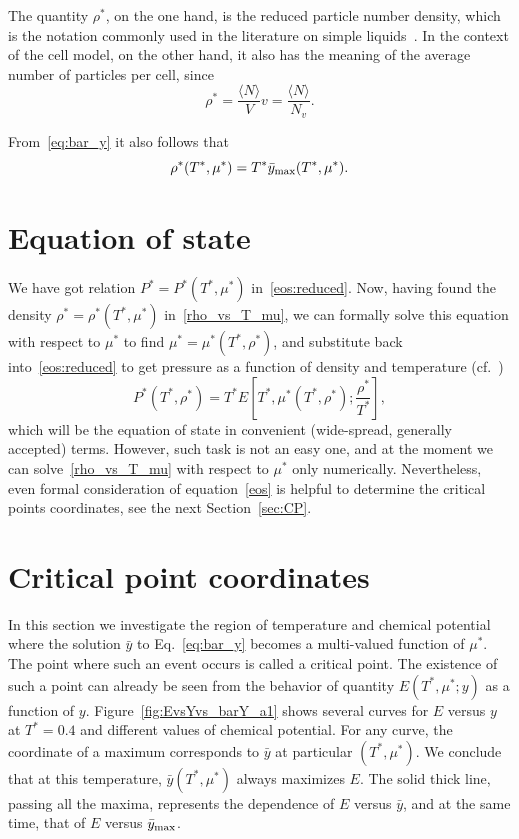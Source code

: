 \documentclass[12pt]{article}
\numberwithin{equation}{section}
\begin{document}
	The quantity $\rho^*$, on the one hand, is the reduced particle number density, which is the notation commonly used in the literature on simple liquids~\cite{HansenMcDonald13}. In the context of the cell model, on the other hand, it also has the meaning of the average number of particles per cell, since
	\begin{equation}
		\rho^* = \frac{\langle N \rangle}{V} v = \frac{\langle N \rangle}{N_v}.
	\end{equation}
	
	From~\eqref{eq:bar_y} it also follows that
	\begin{equation}
		\label{rho_vs_T_mu}
		\rho^*(T^*,\mu^*) = T^* \bar{y}_{\rm max}(T^*,\mu^*).
	\end{equation}
	
	\section{Equation of state}
	We have got relation $P^* = P^*(T^*, \mu^*)$ in~\eqref{eos:reduced}. Now, having found the density $\rho^* = \rho^*(T^*,\mu^*)$ in~\eqref{rho_vs_T_mu}, we can formally solve this equation with respect to $\mu^*$ to find $\mu^* = \mu^*(T^*,\rho^*)$, and substitute back into~\eqref{eos:reduced} to get pressure as a function of density and temperature (cf.~\cite[(2.28)]{KKD20})
	\begin{equation}
		\label{eos}
		P^*(T^*,\rho^*) = T^* E\left[T^*, \mu^*(T^*,\rho^*); \frac{\rho^*}{T^*}\right],
	\end{equation}
	which will be the equation of state in convenient (wide-spread, generally accepted) terms. However, such task is not an easy one, and at the moment we can solve~\eqref{rho_vs_T_mu} with respect to $\mu^*$ only numerically. Nevertheless, even formal consideration of equation~\eqref{eos} is helpful to determine the critical points coordinates, see the next Section~\ref{sec:CP}.
	
	\pagebreak
	\section{\label{sec:CP} Critical point coordinates}
	
	In this section we investigate the region of temperature and chemical potential where the solution $\bar{y}$ to Eq.~\eqref{eq:bar_y} becomes a multi-valued function of $\mu^*$. The point where such an event occurs is called a critical point. The existence of such a point can already be seen from the behavior of quantity $E(T^*,\mu^*;y)$ as a function of $y$. Figure~\ref{fig:EvsYvs_barY_a1} shows several curves for $E$ versus $y$ at $T^*=0.4$ and different values of chemical potential. For any curve, the coordinate of a maximum corresponds to $\bar{y}$ at particular $(T^*,\mu^*)$. We conclude that at this temperature, $\bar{y}(T^*,\mu^*)$ always maximizes $E$. The solid thick line, passing all the maxima, represents the dependence of $E$ versus $\bar{y}$, and at the same time, that of $E$ versus $\bar{y}_{\rm max}$.
	
\end{document}

